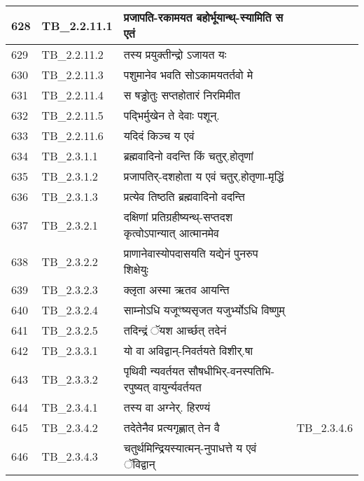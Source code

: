 \documentclass[17pt]{extarticle}
\begin{document}
\begin{longtable}{||p{0.4in}||p{0.9in}||p{4.0in}||p{0.9in}||}
        \hline
            628 & TB\_2.2.11.1 & प्रजापति{-}रकामयत बहोर्भूयान्थ्{-}स्यामिति स एतं &      \\
        \hline
            629 & TB\_2.2.11.2 & तस्य प्रयुक्तीन्द्रो ऽजायत यः &      \\
        \hline
            630 & TB\_2.2.11.3 & पशुमानेव भवति सोऽकामयतर्तवो मे &      \\
        \hline
            631 & TB\_2.2.11.4 & स षड्ढोतुः सप्तहोतारं निरमिमीत &      \\
        \hline
            632 & TB\_2.2.11.5 & पद्भिर्मुखेन ते देवाः पशून्. &      \\
        \hline
            633 & TB\_2.2.11.6 & यदिदं किञ्च य एवं &      \\
        \hline
            634 & TB\_2.3.1.1 & ब्रह्मवादिनो वदन्ति किं चतुर्.होतृणां &      \\
        \hline
            635 & TB\_2.3.1.2 & प्रजापतिर्{-}दशहोता य एवं चतुर्.होतृणा{-}मृद्धिं &      \\
        \hline
            636 & TB\_2.3.1.3 & प्रत्येव तिष्ठति ब्रह्मवादिनो वदन्ति &      \\
        \hline
            637 & TB\_2.3.2.1 & दक्षिणां प्रतिग्रहीष्यन्थ्{-}सप्तदश कृत्वोऽपान्यात् आत्मानमेव &      \\
        \hline
            638 & TB\_2.3.2.2 & प्राणानेवास्योपदासयति यद्येनं पुनरुप शिक्षेयुः &      \\
        \hline
            639 & TB\_2.3.2.3 & क्लृता अस्मा ऋतव आयन्ति &      \\
        \hline
            640 & TB\_2.3.2.4 & साम्नोऽधि यजूꣳष्यसृजत यजुर्भ्योऽधि विष्णुम् &      \\
        \hline
            641 & TB\_2.3.2.5 & तदिन्द्रं ॅयश आर्च्छत् तदेनं &      \\
        \hline
            642 & TB\_2.3.3.1 & यो वा अविद्वान्{-}निवर्तयते विशीर्.षा &      \\
        \hline
            643 & TB\_2.3.3.2 & पृथिवी न्यवर्तयत सौषधीभिर्{-}वनस्पतिभि{-}रपुष्यत् वायुर्न्यवर्तयत &      \\
        \hline
            644 & TB\_2.3.4.1 & तस्य वा अग्नेर्. हिरण्यं &      \\
        \hline
            645 & TB\_2.3.4.2 & तदेतेनैव प्रत्यगृह्णात् तेन वै &  TB\_2.3.4.6       \\
        \hline
            646 & TB\_2.3.4.3 & चतुर्थमिन्द्रियस्यात्मन्{-}नुपाधत्ते य एवं ॅविद्वान् &      \\
        \hline

\end{longtable}
\end{document}
